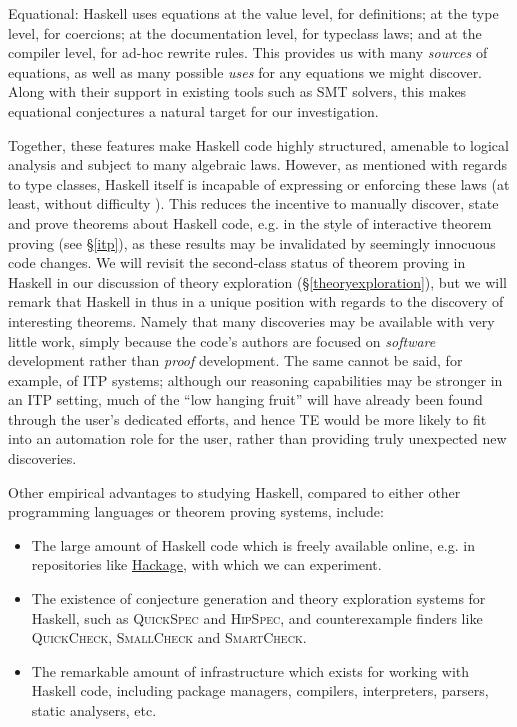 \documentclass[]{article}
\begin{document}
\begin{description}
\item{Equational}: Haskell uses equations at the value level, for definitions; at the type level, for coercions; at the documentation level, for typeclass laws; and at the compiler level, for ad-hoc rewrite rules. This provides us with many \emph{sources} of equations, as well as many possible \emph{uses} for any equations we might discover. Along with their support in existing tools such as SMT solvers, this makes equational conjectures a natural target for our investigation.

\end{description}

Together, these features make Haskell code highly structured, amenable to logical analysis and subject to many algebraic laws. However, as mentioned with regards to type classes, Haskell itself is incapable of expressing or enforcing these laws (at least, without difficulty \cite{lindley2014hasochism}). This reduces the incentive to manually discover, state and prove theorems about Haskell code, e.g. in the style of interactive theorem proving (see \S \ref{itp}), as these results may be invalidated by seemingly innocuous code changes. We will revisit the second-class status of theorem proving in Haskell in our discussion of theory exploration (\S \ref{theoryexploration}), but we will remark that Haskell in thus in a unique position with regards to the discovery of interesting theorems. Namely that many discoveries may be available with very little work, simply because the code's authors are focused on \emph{software} development rather than \emph{proof} development. The same cannot be said, for example, of ITP systems; although our reasoning capabilities may be stronger in an ITP setting, much of the ``low hanging fruit'' will have already been found through the user's dedicated efforts, and hence TE would be more likely to fit into an automation role for the user, rather than providing truly unexpected new discoveries.

Other empirical advantages to studying Haskell, compared to either other programming languages or theorem proving systems, include:

\begin{itemize}

\item The large amount of Haskell code which is freely available online, e.g. in repositories like \href{http://hackage.haskell.org}{Hackage}, with which we can experiment.

\item The existence of conjecture generation and theory exploration systems for Haskell, such as \textsc{QuickSpec} and \textsc{HipSpec}, and counterexample finders like \textsc{QuickCheck}, \textsc{SmallCheck} and \textsc{SmartCheck}.

\item The remarkable amount of infrastructure which exists for working with Haskell code, including package managers, compilers, interpreters, parsers, static analysers, etc.

\end{itemize}
\end{document}
